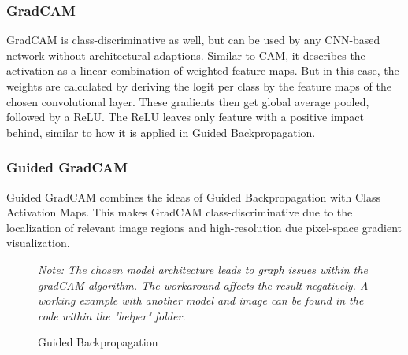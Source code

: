 \documentclass{article}
\begin{document}
\subsubsection{GradCAM}
GradCAM is class-discriminative as well, but can be used by any CNN-based network without architectural adaptions.
Similar to CAM, it describes the activation as a linear combination of weighted feature maps. But in this case, the weights are calculated
by deriving the logit per class by the feature maps of the chosen convolutional layer. These gradients then get global average pooled, followed by a ReLU.
The ReLU leaves only feature with a positive impact behind, similar to how it is applied in Guided Backpropagation.
\subsubsection{Guided GradCAM}
Guided GradCAM combines the ideas of Guided Backpropagation with Class Activation Maps.
This makes GradCAM class-discriminative due to the localization of relevant image regions and high-resolution due pixel-space gradient visualization.
\begin{figure}[h]
  \centering
  \hspace{0.5cm}
  \hspace{0.5cm}
  \caption{Guided Backpropagation}
  \small \textit{{Note: The chosen model architecture leads to graph issues within the gradCAM algorithm. The workaround affects the result negatively.
  A working example with another model and image can be found in the code within the "helper" folder.}}
\end{figure}
\end{document}
